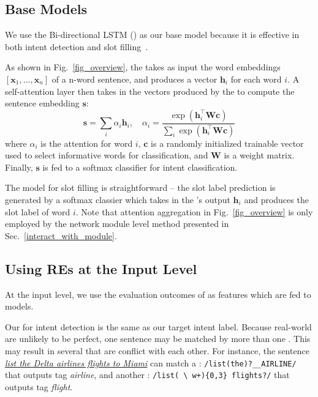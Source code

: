 \subsection{Base Models}
\label{sec:baseline} We use the Bi-directional LSTM (\BLSTM) as our base \NN model because it is effective in both intent detection and
slot filling~\cite{liu2016attention}.

 As shown in Fig.~\ref{fig_overview}, the \BLSTM takes as input the word embeddings $[\textbf{x}_1, ...,
\textbf{x}_n]$ of a n-word sentence, and produces a vector $\textbf{h}_i$ for each word $i$. A self-attention layer then takes in the
vectors produced by the \BLSTM to compute the sentence embedding $\textbf{s}$:
\begin{equation}
\textbf{s} = \sum_{i}{\alpha_i\textbf{h}_i}, \quad \alpha_i=\frac{\exp(\textbf{h}_i^\intercal \textbf{Wc})}{\sum_{i}{\exp(\textbf{h}_i^\intercal \textbf{Wc})}}
\label{eq:simple_att}
\end{equation}
where  $\alpha_i$ is the attention for word $i$, $\textbf{c}$ is a randomly initialized trainable vector used to select informative words for classification, and $\textbf{W}$ is a weight matrix.
Finally, $\textbf{s}$ is fed to a softmax classifier for intent classification.

 The model for slot filling is  straightforward -- the slot label prediction is generated by a softmax classier
which takes in the \BLSTM's output $\textbf{h}_i$ and produces the slot label of word $i$. Note that attention aggregation in
Fig.~\ref{fig_overview} is only employed by the network module level method presented in Sec.~\ref{interact_with_module}.


\subsection{Using REs at the Input Level}
\label{fusion_with_input}
At the input level, we use the evaluation outcomes of \REs as features which are fed to \NN models.

Our \REtag for intent detection is the same as our target intent label.
Because real-world \REs are unlikely to be perfect, one sentence may be matched by more than one \RE. This may result in several \REtags
that are conflict with each other. For instance, the sentence \textsl{\underline{list the Delta airlines flights to Miami}} can match a
\RE: {\small \texttt{/list(\;the)?\;\_\_AIRLINE/}} that outputs tag \emph{airline}, and another \RE: {\small \texttt{/list(\,\textbackslash
w+)\{0,3\} flights?/}} that outputs tag \emph{flight}.

